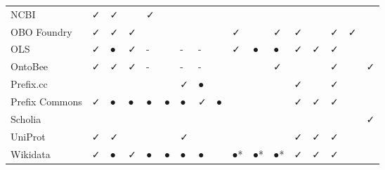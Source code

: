 \begin{table}
\begin{tabular}{lllllllllllllllll}
           NCBI &              ✓ &        ✓ &       &          ✓ &            &          &                &               &         &         &         &                            &        &                 &          &        \\
    OBO Foundry &              ✓ &        ✓ &     ✓ &            &            &          &                &               &       ✓ &         &       ✓ &                          ✓ &        &               ✓ &        ✓ &        \\
            OLS &              ✓ &        ● &     ✓ &          - &            &        - &              - &               &       ✓ &       ● &       ● &                          ✓ &      ✓ &               ✓ &          &        \\
        OntoBee &              ✓ &        ✓ &     ✓ &          - &            &        - &              - &               &         &         &       ✓ &                            &        &               ✓ &          &      ✓ \\
      Prefix.cc &                &          &       &            &            &        ✓ &              ● &               &         &         &         &                          ✓ &        &               ✓ &          &        \\
 Prefix Commons &              ✓ &        ● &     ● &          ● &          ● &        ● &              ✓ &             ● &         &         &         &                          ✓ &      ✓ &               ✓ &          &        \\
        Scholia &                &          &       &            &            &          &                &               &         &         &         &                            &        &                 &          &      ✓ \\
        UniProt &              ✓ &        ✓ &       &            &            &        ✓ &                &               &         &         &         &                          ✓ &      ✓ &               ✓ &          &        \\
       Wikidata &              ✓ &        ● &     ✓ &          ● &          ● &        ● &              ● &               &      ●* &      ●* &      ●* &                          ✓ &      ✓ &               ✓ &          &        \\
\bottomrule
\end{tabular}
\end{table}
